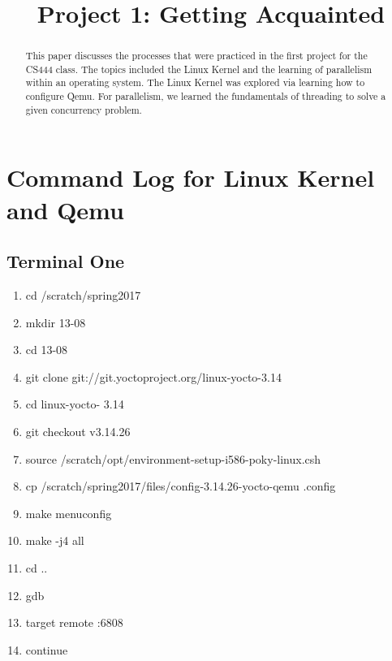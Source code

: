 \documentclass[letterpaper,10pt,draftclsnofoot,onecolumn]{IEEEtran}
\begin{document}
\title{Project 1: Getting Acquainted}

\author{
}

\maketitle
\begin{abstract}
This paper discusses the processes that were practiced in the first project for the CS444
class. The topics included the Linux Kernel and the learning of parallelism within an operating 
system. The Linux Kernel was explored via learning how to configure Qemu. For parallelism, we
learned the fundamentals of threading to solve a given concurrency problem. 
\end{abstract}
\pagebreak

\section{Command Log for Linux Kernel and Qemu}
\subsection{Terminal One}
\begin{enumerate}
\item cd /scratch/spring2017
\item mkdir 13-08
\item cd 13-08
\item git clone git://git.yoctoproject.org/linux-yocto-3.14
\item cd linux-yocto- 3.14
\item git checkout v3.14.26
\item source /scratch/opt/environment-setup-i586-poky-linux.csh
\item cp /scratch/spring2017/files/config-3.14.26-yocto-qemu .config
\item make menuconfig
\item make -j4 all
\item cd ..
\item gdb
\item target remote :6808
\item continue
\end{enumerate}
\end{document}
